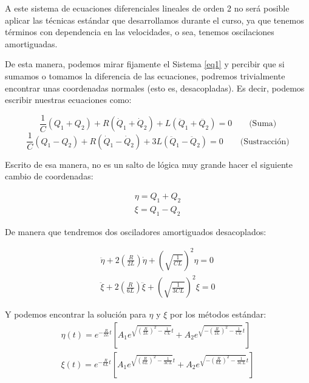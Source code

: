 \documentclass[a4paper,12pt]{article}
\begin{document}
A este sistema de ecuaciones diferenciales lineales de orden 2 no será posible aplicar las técnicas estándar que desarrollamos durante el curso, ya que tenemos términos con dependencia en las velocidades, o sea, tenemos oscilaciones amortiguadas.

De esta manera, podemos mirar fijamente el Sistema \eqref{eq1} y percibir que si sumamos o tomamos la diferencia de las ecuaciones, podremos trivialmente encontrar unas coordenadas normales (esto es, desacopladas). Es decir, podemos escribir nuestras ecuaciones como:

$$ \frac{1}{C} (Q_1 + Q_2) + R (\dot{Q}_1 + \dot{Q}_2)  + L (\ddot{Q}_1 + \ddot{Q_2})=0 \qquad \text{(Suma)}$$
$$\frac{1}{C} (Q_1 - Q_2) + R (\dot{Q}_1 - \dot{Q}_2) + 3L (\ddot{Q}_1 - \ddot{Q}_2) = 0 \qquad \text{(Sustracción)}$$

Escrito de esa manera, no es un salto de lógica muy grande hacer el siguiente cambio de coordenadas:

\begin{equation}
  \begin{aligned}
    \eta = Q_1 + Q_2 \\
    \xi = Q_1 - Q_2 
  \end{aligned} 
\end{equation}

De manera que tendremos dos osciladores amortiguados desacoplados:

\begin{equation}
\label{coords1}
  \begin{aligned}
    \ddot{\eta} + 2\left(\frac{R}{2L}\right) \dot{\eta} + \left(\sqrt{\frac{1}{CL}}\right)^2 \eta = 0 \\
    \ddot{\xi} + 2\left(\frac{R}{6L}\right) \ddot{\xi} + \left(\sqrt{\frac{1}{3CL}}\right)^2 \xi = 0
  \end{aligned}
\end{equation}

Y podemos encontrar la solución para $\eta$ y $\xi$ por los métodos estándar:
\begin{equation}
\label{coords1}
  \begin{aligned}
    \eta(t) = e^{-\frac{R}{2L}t}\left[A_1 e^{\sqrt{\left(\frac{R}{2L}\right)^2 -\frac{1}{CL}}t} + A_2e^{\sqrt{-\left(\frac{R}{2L}\right)^2 -\frac{1}{CL}}t}\right]\\
    \xi(t) = e^{-\frac{R}{6L}t}\left[A_1 e^{\sqrt{\left(\frac{R}{6L}\right)^2 -\frac{1}{3CL}}t} + A_2e^{\sqrt{-\left(\frac{R}{6L}\right)^2 -\frac{1}{3CL}}t}\right]
  \end{aligned}
\end{equation}
\end{document}
